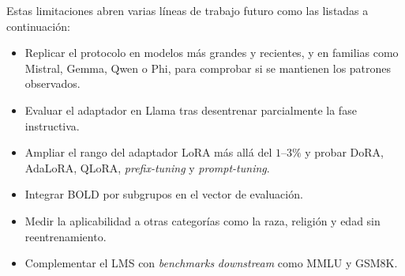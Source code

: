\documentclass[12pt,a4paper]{report}
\begin{document}
Estas limitaciones abren varias líneas de trabajo futuro como las listadas a continuación:
\begin{itemize}
  \item Replicar el protocolo en modelos más grandes y recientes, y en familias como Mistral, Gemma, Qwen o Phi, para comprobar si se mantienen los patrones observados.
  \item Evaluar el adaptador en Llama tras desentrenar parcialmente la fase instructiva.
  \item Ampliar el rango del adaptador LoRA más allá del $1$--$3\%$ y probar DoRA, AdaLoRA, QLoRA, \textit{prefix-tuning} y \textit{prompt-tuning}.
  \item Integrar BOLD por subgrupos en el vector de evaluación.
  \item Medir la aplicabilidad a otras categorías como la raza, religión y edad sin reentrenamiento.
  \item Complementar el LMS con \textit{benchmarks} \textit{downstream} como MMLU y GSM8K.
\end{itemize}



\end{document}
